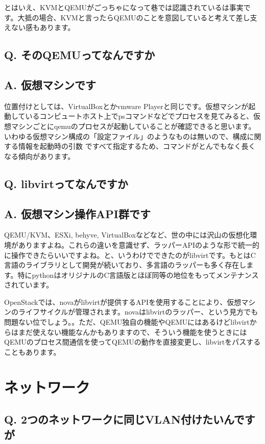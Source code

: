 \documentclass[9pt,b5paper,tombo,openany]{jsbook}
\begin{document}
とはいえ、KVMとQEMUがごっちゃになって巷では認識されているは事実です。大抵の場合、KVMと言ったらQEMUのことを意図していると考えて差し支えない感もあります。

\subsection*{Q. そのQEMUってなんですか}
\subsection*{A. 仮想マシンです}
位置付けとしては、VirtualBoxとかvmware Playerと同じです。仮想マシンが起動しているコンピュートホスト上でpsコマンドなどでプロセスを見てみると、仮想マシンごとにqemuのプロセスが起動していることが確認できると思います。いわゆる仮想マシン構成の「設定ファイル」のようなものは無いので、構成に関する情報を起動時の引数
ですべて指定するため、コマンドがとんでもなく長くなる傾向があります。

\subsection*{Q. libvirtってなんですか}
\subsection*{A. 仮想マシン操作API群です}
QEMU/KVM、ESXi, behyve, VirtualBoxなどなど、世の中には沢山の仮想化環境がありますよね。これらの違いを意識せず、ラッパーAPIのような形で統一的に操作できたらいいですよね。と、いうわけでできたのがlibvirtです。もとはC言語のライブラリとして開発が続いており、多言語のラッパーも多く存在します。特にpythonはオリジナルのC言語版とほぼ同等の地位をもってメンテナンスされています。

OpenStackでは、novaがlibvirtが提供するAPIを使用することにより、仮想マシンのライフサイクルが管理されます。novaはlibvirtのラッパー、という見方でも問題ない位でしょう。。ただ、QEMU独自の機能やQEMUにはあるけどlibvirtからはまだ使えない機能なんかもありますので、そういう機能を使うときにはQEMUのプロセス間通信を使ってQEMUの動作を直接変更し、libvirtをパスすることもあります。

\section{ネットワーク}
\subsection*{Q. 2つのネットワークに同じVLAN付けたいんですが}
\end{document}
